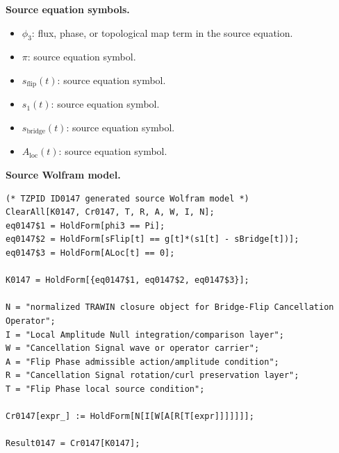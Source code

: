 \begin{minipage}[t]{0.49\linewidth}
\begingroup
\small
\raggedright
\textbf{Source equation symbols.}\par
\begin{itemize}[leftmargin=1.35em,itemsep=1pt,topsep=1pt,parsep=0pt]
    \item $\phi_3$: flux, phase, or topological map term in the source equation.
    \item $\pi$: source equation symbol.
    \item $s_{\mathrm{flip}}(t)$: source equation symbol.
    \item $s_1(t)$: source equation symbol.
    \item $s_{\mathrm{bridge}}(t)$: source equation symbol.
    \item $A_{\mathrm{loc}}(t)$: source equation symbol.
\end{itemize}
\endgroup
\end{minipage}\hfill
\begin{minipage}[t]{0.47\linewidth}
\begingroup
\scriptsize
\raggedright
\textbf{Source Wolfram model.}\par
\begin{Verbatim}[fontsize=\tiny,breaklines=true,breakanywhere=true]
(* TZPID ID0147 generated source Wolfram model *)
ClearAll[K0147, Cr0147, T, R, A, W, I, N];
eq0147$1 = HoldForm[phi3 == Pi];
eq0147$2 = HoldForm[sFlip[t] == g[t]*(s1[t] - sBridge[t])];
eq0147$3 = HoldForm[ALoc[t] == 0];

K0147 = HoldForm[{eq0147$1, eq0147$2, eq0147$3}];

N = "normalized TRAWIN closure object for Bridge-Flip Cancellation Operator";
I = "Local Amplitude Null integration/comparison layer";
W = "Cancellation Signal wave or operator carrier";
A = "Flip Phase admissible action/amplitude condition";
R = "Cancellation Signal rotation/curl preservation layer";
T = "Flip Phase local source condition";

Cr0147[expr_] := HoldForm[N[I[W[A[R[T[expr]]]]]]];

Result0147 = Cr0147[K0147];
\end{Verbatim}
\endgroup
\end{minipage}


